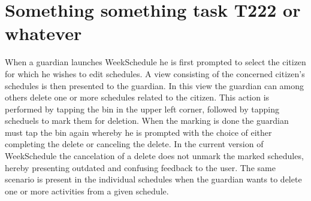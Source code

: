 \section{Something something task T222 or whatever}
When a guardian launches WeekSchedule he is first prompted to select the citizen for which he wishes to edit schedules.
A view consisting of the concerned citizen's schedules is then presented to the guardian.
In this view the guardian can among others delete one or more schedules related to the citizen.
This action is performed by tapping the bin in the upper left corner, followed by tapping scheduels to mark them for deletion.
When the marking is done the guardian must tap the bin again whereby he is prompted with the choice of either completing the delete or canceling the delete.
In the current version of WeekSchedule the cancelation of a delete does not unmark the marked schedules, hereby presenting outdated and confusing feedback to the user.
The same scenario is present in the individual schedules when the guardian wants to delete one or more activities from a given schedule.


